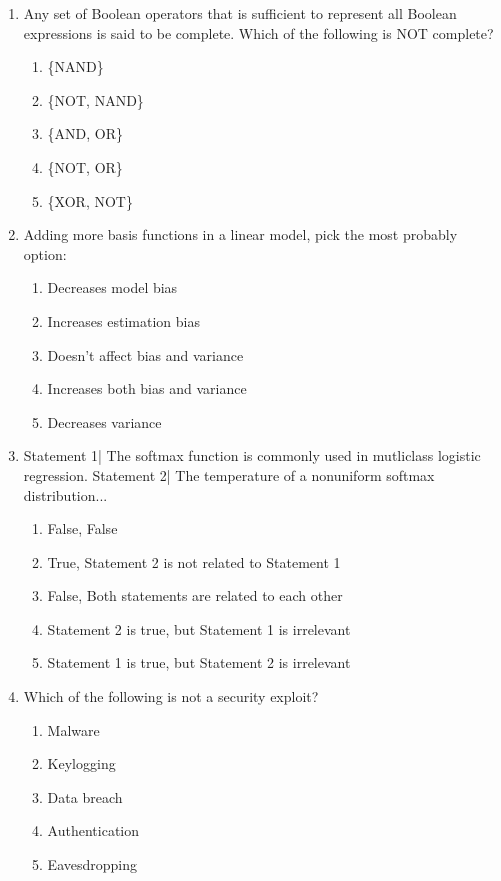 \documentclass[12pt]{article}
\begin{document}
\begin{enumerate}[label=\arabic*.]
\begin{enumerate}[label=(\alph*)]
    \item 620
    \item 520
    \item 220
    \item 120
    \item 820
\end{enumerate}
\item Any set of Boolean operators that is sufficient to represent all Boolean expressions is said to be complete. Which of the following is NOT complete?
\begin{enumerate}[label=(\alph*)]
    \item \{NAND\}
    \item \{NOT, NAND\}
    \item \{AND, OR\}
    \item \{NOT, OR\}
    \item \{XOR, NOT\}
\end{enumerate}
\item Adding more basis functions in a linear model, pick the most probably option:
\begin{enumerate}[label=(\alph*)]
    \item Decreases model bias
    \item Increases estimation bias
    \item Doesn't affect bias and variance
    \item Increases both bias and variance
    \item Decreases variance
\end{enumerate}
\item Statement 1| The softmax function is commonly used in mutliclass logistic regression. Statement 2| The temperature of a nonuniform softmax distribution...
\begin{enumerate}[label=(\alph*)]
    \item False, False
    \item True, Statement 2 is not related to Statement 1
    \item False, Both statements are related to each other
    \item Statement 2 is true, but Statement 1 is irrelevant
    \item Statement 1 is true, but Statement 2 is irrelevant
\end{enumerate}
\item Which of the following is not a security exploit?
\begin{enumerate}[label=(\alph*)]
    \item Malware
    \item Keylogging
    \item Data breach
    \item Authentication
    \item Eavesdropping
\end{enumerate}
\end{enumerate}
\end{document}

